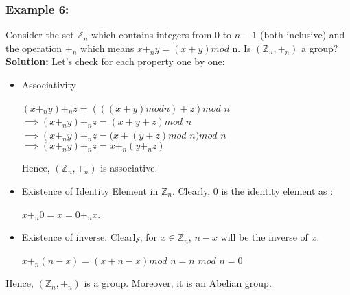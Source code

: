 \documentclass[11pt]{article}
\begin{document}
\subsubsection{Example 6:}
Consider the set $\mathbb{Z}_n$ which contains integers from 0 to $n - 1$ (both inclusive) and the operation $+_n$ which means $x +_n y = (x + y) mod$ n. Is $(\mathbb{Z}_n, +_n)$ a group?\\
\textbf{Solution:} Let's check for each property one by one:\\
\begin{itemize}
    \item Associativity
    \begin{center}
        $(x +_n y) +_n z = (((x + y) mod n) + z) mod $ $n$\\
        \vspace{1mm}
        $\implies (x +_n y) +_n z = (x + y + z) mod $ $n$\\
        \vspace{1mm}
        $\implies (x +_n y) +_n z = (x + (y + z) mod $ $n) mod $ $n$\\
        \vspace{1mm}
        $\implies (x +_n y) +_n z = x +_n (y +_n z)$
    \end{center}
    Hence, $(\mathbb{Z}_n, +_n)$ is associative.

    \item Existence of Identity Element in $\mathbb{Z}_n$. Clearly, 0 is the identity element as :\\
    \begin{center}
        $x +_n 0 = x = 0 +_n x$.
    \end{center}

    \item Existence of inverse. Clearly, for $x \in \mathbb{Z}_n$, $n - x$ will be the inverse of $x$.
    \begin{center}
        $x +_n (n - x) = (x + n - x) mod$ $n = n$ $mod $ $n = 0$
    \end{center}
\end{itemize}
Hence, $(\mathbb{Z}_n, +_n)$ is a group. Moreover, it is an Abelian group.\\
\end{document}

